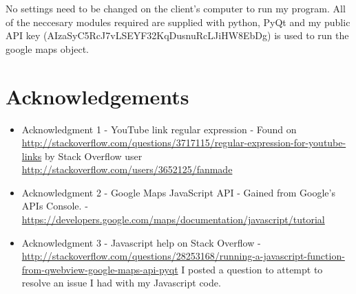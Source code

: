 No settings need to be changed on the client's computer to run my program. All of the neccesary modules required are supplied with python, PyQt and my public API key (AIzaSyC5RcJ7vLSEYF32KqDusnuRcLJiHW8EbDg)  is used to run the google maps object.





\section{Acknowledgements}

\begin{itemize}
\item Acknowledgment 1 - YouTube link regular expression - Found on \url{http://stackoverflow.com/questions/3717115/regular-expression-for-youtube-links} by Stack Overflow user \url{http://stackoverflow.com/users/3652125/fanmade}
\item Acknowledgment 2 - Google Maps JavaScript API - Gained from Google's APIs Console. - \url{https://developers.google.com/maps/documentation/javascript/tutorial}
\item Acknowledgment 3 - Javascript help on Stack Overflow - \url{http://stackoverflow.com/questions/28253168/running-a-javascript-function-from-qwebview-google-maps-api-pyqt} I posted a question to attempt to resolve an issue I had with my Javascript code.
\end{itemize}
